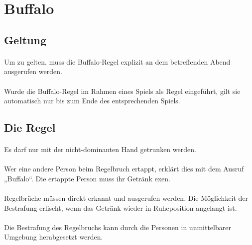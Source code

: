 \section{Buffalo}
\subsection{Geltung}
\paragraph{}
Um zu gelten, muss die Buffalo-Regel explizit an dem betreffenden Abend ausgerufen werden.

\paragraph{}
Wurde die Buffalo-Regel im Rahmen eines Spiels als Regel eingeführt, gilt sie automatisch nur bis zum Ende des entsprechenden Spiels.

\subsection{Die Regel}
\paragraph{}
Es darf nur mit der nicht-dominanten Hand getrunken werden.

\paragraph{}
Wer eine andere Person beim Regelbruch ertappt, erklärt dies mit dem Ausruf „Buffalo“.
Die ertappte Person muss ihr Getränk exen.

\paragraph{}
Regelbrüche müssen direkt erkannt und ausgerufen werden.
Die Möglichkeit der Bestrafung erlischt, wenn das Getränk wieder in Ruheposition angelangt ist.

\paragraph{}
Die Bestrafung des Regelbruchs kann durch die Personen in unmittelbarer Umgebung herabgesetzt werden.

